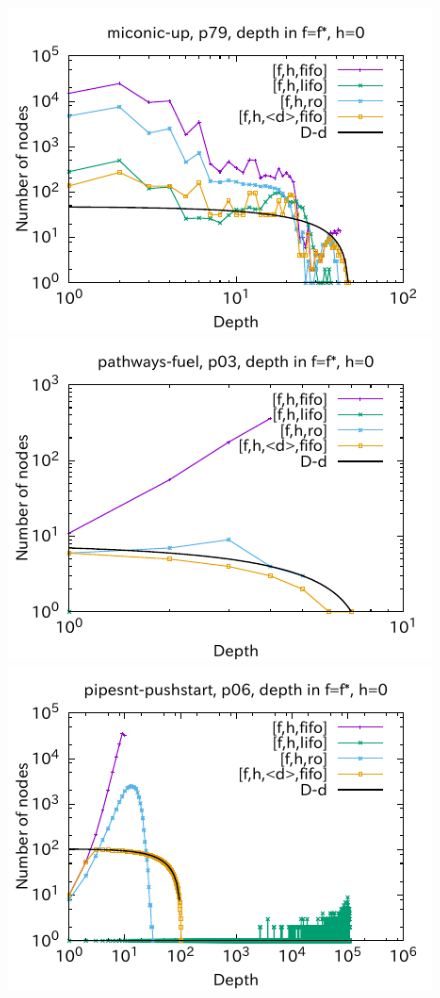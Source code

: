 \begin{figure}[htbp]
\includegraphics{img/output-lmcut/miconic-up/p79.pdf}
\includegraphics{img/output-lmcut/pathways-fuel/p03.pdf}
\includegraphics{img/output-lmcut/pipesnt-pushstart/p06.pdf}

\end{figure}

